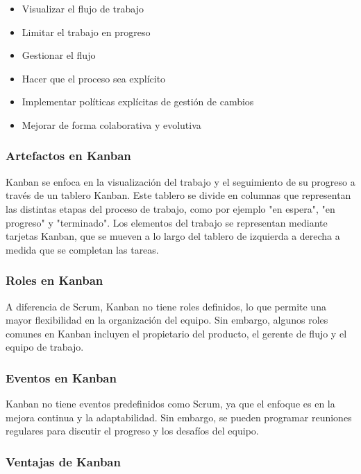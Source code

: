 \documentclass[executivepaper]{article}
\begin{document}
\begin{itemize}
\item Visualizar el flujo de trabajo
\item Limitar el trabajo en progreso
\item Gestionar el flujo
\item Hacer que el proceso sea explícito
\item Implementar políticas explícitas de gestión de cambios
\item Mejorar de forma colaborativa y evolutiva
\end{itemize}

\subsubsection*{Artefactos en Kanban}

Kanban se enfoca en la visualización del trabajo y el seguimiento de su progreso a través de un tablero Kanban. Este tablero se divide en columnas que representan las distintas etapas del proceso de trabajo, como por ejemplo "en espera", "en progreso" y "terminado". Los elementos del trabajo se representan mediante tarjetas Kanban, que se mueven a lo largo del tablero de izquierda a derecha a medida que se completan las tareas.

\subsubsection*{Roles en Kanban}

A diferencia de Scrum, Kanban no tiene roles definidos, lo que permite una mayor flexibilidad en la organización del equipo. Sin embargo, algunos roles comunes en Kanban incluyen el propietario del producto, el gerente de flujo y el equipo de trabajo.

\subsubsection*{Eventos en Kanban}

Kanban no tiene eventos predefinidos como Scrum, ya que el enfoque es en la mejora continua y la adaptabilidad. Sin embargo, se pueden programar reuniones regulares para discutir el progreso y los desafíos del equipo.

\subsubsection*{Ventajas de Kanban}
\end{document}
